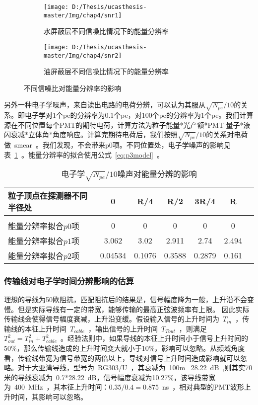 \begin{figure}[!htbp]
  \centering
  \begin{subfigure}[b]{\MySubFactor\textwidth}
    \texttt{[image: D:/Thesis/ucasthesis-master/Img/chap4/snr1]}
    \caption{水屏蔽层不同信噪比情况下的能量分辨率}
    \label{fig:snr_1}
  \end{subfigure}%
  \quad\quad\quad\quad\quad\quad%
  \begin{subfigure}[b]{\MySubFactor\textwidth}
    \texttt{[image: D:/Thesis/ucasthesis-master/Img/chap4/snr2]}
    \caption{油屏蔽层不同信噪比情况下的能量分辨率}
    \label{fig:snr_2}
  \end{subfigure}
    \caption{不同信噪比对能量分辨率的影响}
  \label{fig:snr}
\end{figure}




另外一种电子学噪声，来自读出电路的电荷分辨，可以认为其服从$\sqrt{N_{pe}}/10$的关系。即电子学对1个pe的分辨率为0.1个pe，对100个pe的分辨率为1个pe。我们计算源在不同位置每个PMT的期待电荷，计算方法为粒子能量*光产额*PMT 量子*液闪衰减*立体角*角度响应。计算完期待电荷后，我们按照$\sqrt{N_{pe}}/10$的关系对电荷做~smear~。我们发现，不会带来p0项。不同位置处，电子学噪声的影响见表~\ref{tab:tb2}~。能量分辨率的拟合使用公式~\ref{eq:p3model}~。
\begin{table}[htbp]
\centering  %
\begin{tabular}{lcccccc}  %
\hline
粒子顶点在探测器不同半径处&0& R/4 &R/2 &3R/4 &R \\ \hline
\\ 能量分辨率拟合$p0$项 & 0 &0 &0 &0& 0
\\ 能量分辨率拟合$p1$项  & 3.062 &3.02 &2.911& 2.74 &2.494
\\能量分辨率拟合$p2$项 &  0.04534& 0.1076 &0.3588 &0.2879 &0.161
\\ \hline
\end{tabular}
\caption{电子学$\sqrt{N_{pe}}/10$噪声对能量分辨的影响}
\label{tab:tb2}
\end{table}


\subsubsection{传输线对电子学时间分辨影响的估算}
理想的导线为50欧阻抗，匹配阻抗后的结果是，信号幅度降为一般，上升沿不会变慢。但是实际导线有一定的带宽，能够传输的最高正弦波频率有上限。 因此实际传输线会使得信号幅度衰减，上升沿变缓。假设输入信号的上升时间为~$T_{in}$~，传输线的本征上升时间~$T_{cable}$~，输出信号的上升时间~$T_{Tout}$~，则满足~$T_{out}^2=T_{in}^2+T_{cable}^2$~。经验法则中，如果导线的本征上升时间小于信号上升时间的50\%，那么传输线造成的上升时间变大就小于10\%，影响可以忽略。从频域角度看，传输线带宽为信号带宽的两倍以上，导线对信号上升时间造成影响就可以忽略。对于大亚湾导线，型号为~RG303/U~，其衰减为~100m ~28.22~dB~,则其实70米的导线衰减为~0.7*28.22~dB，信号幅度衰减为10.27\%，该导线带宽为~400~MHz~，其本征上升时间：$0.35/0.4=0.875$~ns~，相对典型的PMT波形上升时间，其影响可以忽略。

